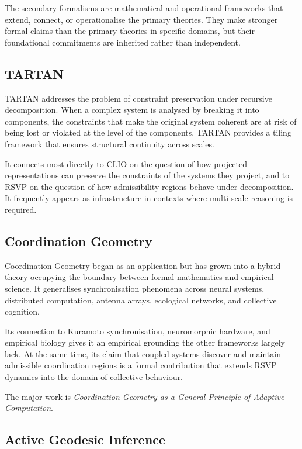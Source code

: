 \documentclass[12pt, twoside]{article}
\begin{document}
The secondary formalisms are mathematical and operational frameworks that
extend, connect, or operationalise the primary theories. They make stronger
formal claims than the primary theories in specific domains, but their
foundational commitments are inherited rather than independent.

\subsection{TARTAN}

TARTAN addresses the problem of constraint preservation under recursive
decomposition. When a complex system is analysed by breaking it into
components, the constraints that make the original system coherent are at risk
of being lost or violated at the level of the components. TARTAN provides a
tiling framework that ensures structural continuity across scales.

It connects most directly to CLIO on the question of how projected
representations can preserve the constraints of the systems they project, and
to RSVP on the question of how admissibility regions behave under
decomposition. It frequently appears as infrastructure in contexts where
multi-scale reasoning is required.

\subsection{Coordination Geometry}

Coordination Geometry began as an application but has grown into a hybrid
theory occupying the boundary between formal mathematics and empirical
science. It generalises synchronisation phenomena across neural systems,
distributed computation, antenna arrays, ecological networks, and collective
cognition.

Its connection to Kuramoto synchronisation, neuromorphic hardware, and
empirical biology gives it an empirical grounding the other frameworks
largely lack. At the same time, its claim that coupled systems discover and
maintain admissible coordination regions is a formal contribution that
extends RSVP dynamics into the domain of collective behaviour.

The major work is \emph{Coordination Geometry as a General Principle of
Adaptive Computation}.

\subsection{Active Geodesic Inference}
\end{document}
